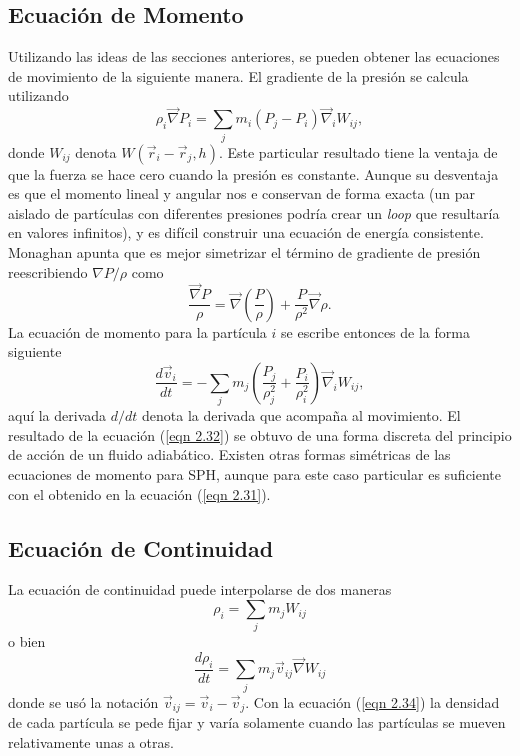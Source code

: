 \documentclass[a4paper,openright,12pt]{book}
\begin{document}
\subsection{Ecuación de Momento}
Utilizando las ideas de las secciones anteriores, se pueden obtener las ecuaciones de movimiento de la siguiente manera. El gradiente de la presión se calcula utilizando 
\begin{equation}
\rho_{i} \vec{\nabla} P_{i}
=
\sum_{j} m_{i} (P_{j}-P_{i})\vec{\nabla}_{i}W_{ij},\label{eqn 2.30}
\end{equation}
donde $W_{ij}$ denota $W(\vec{r}_{i}-\vec{r}_{j},h)$. Este particular resultado tiene la ventaja de que la fuerza se hace cero cuando la presión es constante. Aunque su desventaja es que el momento lineal y angular nos e conservan de forma exacta (un par aislado de partículas con diferentes presiones podría crear un \textit{loop} que resultaría en valores infinitos), y es difícil construir una ecuación de energía consistente. Monaghan apunta que es mejor simetrizar el término de gradiente de presión reescribiendo $\nabla P / \rho$ como 
\begin{equation}
\frac{\vec{\nabla} P}{\rho} 
=
\vec{\nabla} \left(\frac{P}{\rho}\right)
+ \frac{P}{\rho^{2}}\vec{\nabla}\rho.\label{eqn 2.31}
\end{equation}
La ecuación de momento para la partícula $i$ se escribe entonces de la forma siguiente
\begin{equation}
\frac{d \vec{v}_{i}}{d t}
=
- \sum_{j} m_{j} 
\left(\frac{P_{j}}{\rho_{j}^{2}}+ \frac{P_{i}}{\rho_{i}^{2}}\right)
\vec{\nabla}_{i}W_{ij}, \label{eqn 2.32}
\end{equation}
aquí la derivada $d/dt$ denota la derivada que acompaña al movimiento. El resultado de la ecuación (\ref{eqn 2.32}) se obtuvo de una forma discreta del principio de acción de un fluido adiabático. Existen otras formas simétricas de las ecuaciones de momento para SPH, aunque para este caso particular es suficiente con el obtenido en la ecuación (\ref{eqn 2.31}).
\subsection{Ecuación de Continuidad}
La ecuación de continuidad puede interpolarse de dos maneras
\begin{equation}
\rho_{i}=\sum_{j}m_{j}W_{ij}\label{eqn 2.33}
\end{equation}
o bien
\begin{equation}
\frac{d\rho_{i}}{d t}
=
\sum_{j}m_{j}\vec{v}_{ij}\vec{\nabla}W_{ij}\label{eqn 2.34}
\end{equation}
donde se usó la notación $\vec{v}_{ij} = \vec{v}_{i}-\vec{v}_{j}$. Con la ecuación (\ref{eqn 2.34}) la densidad de cada partícula se pede fijar y varía solamente cuando las partículas se mueven relativamente unas a otras.
\end{document}
